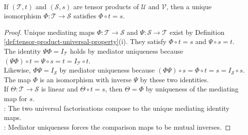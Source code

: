 \begin{corollary} \label{cor:tensor-product-unique-up-to-isomorphism} \\
If $(\mathcal{T},t)$ and $(\mathcal{S},s)$ are tensor products of $\mathcal{U}$ and $\mathcal{V}$, then a unique isomorphism $\Phi:\mathcal{T}\to\mathcal{S}$ satisfies $\Phi\circ t=s$.
\begin{proof}
Unique mediating maps $\Phi:\mathcal{T}\to\mathcal{S}$ and $\Psi:\mathcal{S}\to\mathcal{T}$ exist by Definition \ref{def:tensor-product-universal-property}(i). They satisfy $\Phi\circ t=s$ and $\Psi\circ s=t$.\\
The identity $\Psi\Phi=I_{\mathcal{T}}$ holds by mediator uniqueness because $(\Psi\Phi)\circ t=\Psi\circ s=t=I_{\mathcal{T}}\circ t$.\\
Likewise, $\Phi\Psi=I_{\mathcal{S}}$ by mediator uniqueness because $(\Phi\Psi)\circ s=\Phi\circ t=s=I_{\mathcal{S}}\circ s$.\\
The map $\Phi$ is an isomorphism with inverse $\Psi$ by these two identities.\\
If $\Theta:\mathcal{T}\to\mathcal{S}$ is linear and $\Theta\circ t=s$, then $\Theta=\Phi$ by uniqueness of the mediating map for $s$.\\
: The two universal factorisations compose to the unique mediating identity maps.\\
: Mediator uniqueness forces the comparison maps to be mutual inverses.
\end{proof}
\end{corollary}

